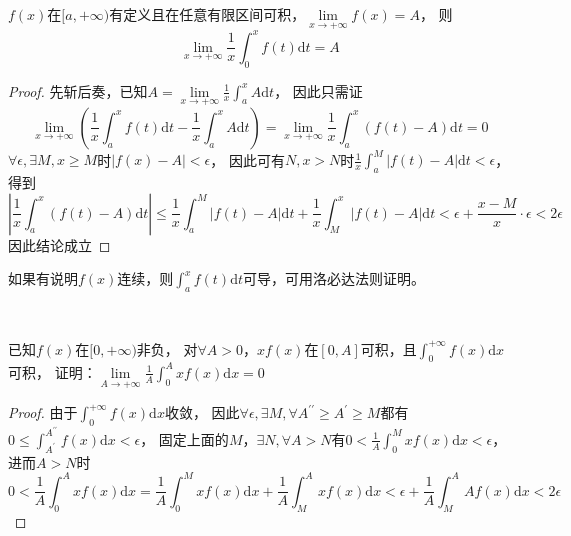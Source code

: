 \begin{theorem}[函数形式平均值定理]
  $f(x)$在$[a,+\infty)$有定义且在任意有限区间可积，$\lim \limits _{x \rightarrow +\infty}f(x) = A$，
  则
  \begin{equation*}
    \lim \limits _{x \rightarrow +\infty}\frac{1}{x} \int_0^x f(t)\mathrm{d} t = A
  \end{equation*}
\end{theorem}

\begin{proof}
  先斩后奏，已知$A = \lim \limits _{x \rightarrow +\infty} \frac{1}{x} \int_a^x A \mathrm{d} t $，
  因此只需证
  \begin{equation*}
    \lim \limits _{x \rightarrow +\infty} \left( \frac{1}{x} \int_a^x f(t)\mathrm{d} t - \frac{1}{x} \int_a^x A \mathrm{d} t \right) =  \lim \limits _{x \rightarrow +\infty} \frac{1}{x}\int_a^x \left( f(t) - A \right) \mathrm{d} t = 0
  \end{equation*}
  $\forall \epsilon, \exists M, x \geq M$时$|f(x) - A| < \epsilon$，
  因此可有$N, x > N$时$\frac{1}{x} \int_a^M |f(t) - A|\mathrm{d} t < \epsilon$，
  得到
  \begin{equation*}
    \left| \frac{1}{x} \int_a^x(f(t) - A)\mathrm{d} t\right| \leq \frac{1}{x} \int_a^M |f(t) - A| \mathrm{d} t + \frac{1}{x} \int_M^x |f(t) - A|\mathrm{d} t < \epsilon + \frac{x - M}{x}\cdot \epsilon < 2\epsilon
  \end{equation*}
  因此结论成立
\end{proof}

\begin{note}
  如果有说明$f(x)$连续，则$\int_a^x f(t)\mathrm{d} t$可导，可用洛必达法则证明。
\end{note}

~

\begin{exercise}[相关练习]
  已知$f(x)$在$[0,+\infty)$非负，
  对$\forall A > 0$，$xf(x)$在$[0,A]$可积，且$\int_0^{+\infty}f(x)\mathrm{d} x$可积，
  证明：$\lim \limits _{A \rightarrow +\infty} \frac{1}{A} \int_0^A xf(x)\mathrm{d} x = 0$
\end{exercise}

\begin{proof}
  由于$\int_0^{+\infty}f(x)\mathrm{d} x $收敛，
  因此$\forall \epsilon, \exists M, \forall A^{\prime\prime} \geq A^{\prime} \geq M$都有
  $0 \leq \int_{A^{\prime}}^{A^{\prime\prime}} f(x)\mathrm{d} x < \epsilon$，
  固定上面的$M$，$\exists N, \forall A > N$有$0 < \frac{1}{A} \int_0^M xf(x)\mathrm{d} x < \epsilon$，
  进而$A > N$时
  \begin{equation*}
    0 < \frac{1}{A} \int_0^A xf(x)\mathrm{d} x = \frac{1}{A} \int_0^M xf(x)\mathrm{d} x + \frac{1}{A} \int_M^A xf(x)\mathrm{d} x < \epsilon + \frac{1}{A} \int_M^A Af(x)\mathrm{d} x < 2\epsilon
  \end{equation*}
\end{proof}




